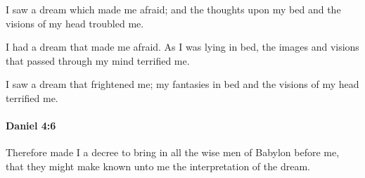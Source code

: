 			\begin{versebox}
					\item[BHS] 
					\item[ASV] I saw a dream which made me afraid; and the thoughts upon my bed and the visions of my head troubled me.
					\item[NIV] I had a dream that made me afraid. As I was lying in bed, the images and visions that passed through my mind terrified me.
					\item[NRSV] I saw a dream that frightened me; my fantasies in bed and the visions of my head terrified me.
			\end{versebox}

		\paragraph{Daniel 4:6} %
			\label{DANIEL-4-6}

			Therefore made I a decree to bring in all the wise men of Babylon before me, that they might make known unto me the interpretation of the dream.

